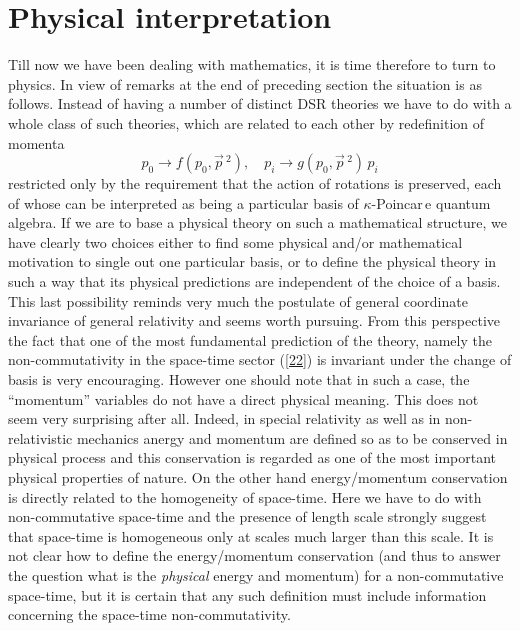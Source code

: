 \documentclass[a4paper,a4paper]{article}
\begin{document}
\section{Physical interpretation}

Till now we have been dealing with mathematics, it is time
therefore to turn to physics. In view of remarks at the end of
preceding section the situation is as follows. Instead of having a
number of distinct DSR theories we have to do with a whole class
of such theories, which are related to each other by redefinition
of momenta
\begin{equation}\label{23}
  p_0 \rightarrow f(p_0, \vec{p}\, {}^2), \quad p_i \rightarrow g(p_0, \vec{p}\,
  {}^2)\, p_i
\end{equation}
 restricted only by the requirement that the action of
rotations is preserved, each of whose can be interpreted as being
a particular basis of $\kappa$-Poincar\,e quantum algebra. If we
are to base a physical theory on such a mathematical structure, we
have clearly two choices either to find some physical and/or
mathematical motivation to single out one particular basis, or to
define the physical theory in such a way that its physical
predictions are independent of the choice of a basis. This last
possibility reminds very much the postulate of general coordinate
invariance of general relativity and seems worth pursuing. From
this perspective the fact that one of the most fundamental
prediction of the theory, namely the non-commutativity in the
space-time sector (\ref{22}) is invariant under the change of
basis is very encouraging. However one  should note that in such a
case, the ``momentum'' variables do not have a direct physical
meaning. This does not seem very surprising after all. Indeed, in
special relativity as well as in non-relativistic mechanics anergy
and momentum are defined so as to be conserved in physical process
and this conservation is regarded as one of the most important
physical properties of nature. On the other hand energy/momentum
conservation is directly related to the homogeneity of space-time.
Here we have to do with non-commutative space-time and the
presence of length scale strongly suggest that space-time is
homogeneous only at scales much larger than this scale. It is not
clear how to define the energy/momentum conservation (and thus to
answer the question what is the {\em physical} energy and
momentum) for a non-commutative space-time, but it is certain that
any such definition must include information concerning the
space-time non-commutativity.
\end{document}
